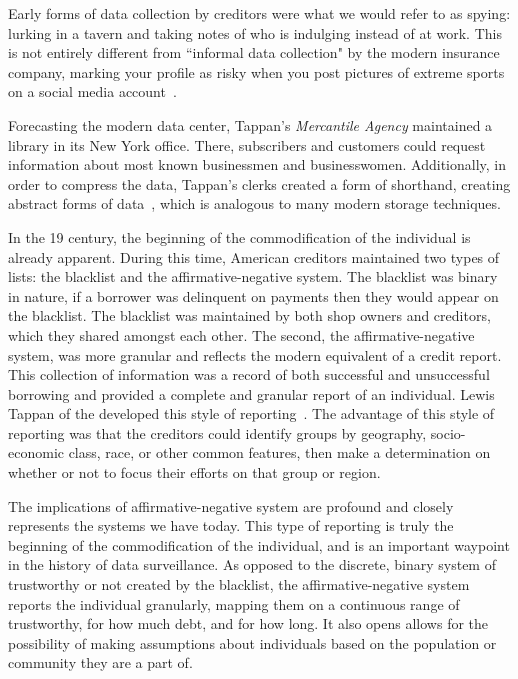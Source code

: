 Early forms of data collection by creditors were what we would refer to as
spying: lurking in a tavern and taking notes of who is indulging instead of at
work. This is not entirely different from ``informal data collection" by the
modern insurance company, marking your profile as risky when you post pictures
of extreme sports on a social media account~\cite{naic2012}.

Forecasting the modern data center, Tappan's \textit{Mercantile Agency}
maintained a library in its New York office. There, subscribers and customers
could request information about most known businessmen and businesswomen.
Additionally, in order to compress the data, Tappan's clerks created a form of
shorthand, creating abstract forms of data~\cite{lauer2017creditworthy}, which
is analogous to many modern storage techniques.


In the 19 century, the beginning of the commodification of the
individual is already apparent. During this time, American creditors
maintained two types of lists: the blacklist and the affirmative-negative
system. The blacklist was binary in nature, if a borrower was delinquent on
payments then they would appear on the blacklist. The blacklist was maintained
by both shop owners and creditors, which they shared amongst each other. The
second, the affirmative-negative system, was more granular and reflects the modern
equivalent of a credit report. This collection of information was a record of
both successful and unsuccessful borrowing and provided a complete and granular
report of an individual. Lewis Tappan of the \mca developed this style of
reporting~\cite{lauer2017creditworthy}. The advantage of this style of reporting was that the creditors
could identify groups by geography, socio-economic class, race, or other common
features, then make a determination on whether or not to focus their efforts on
that group or region.

The implications of affirmative-negative system are profound and closely
represents the systems we have today. This type of reporting is truly the
beginning of the commodification of the individual, and is an important
waypoint in the history of data surveillance. As opposed to the discrete,
binary system of trustworthy or not created by the blacklist, the
affirmative-negative system reports the individual granularly, mapping them on
a continuous range of trustworthy, for how much debt, and for how long. It also
opens allows for the possibility of making assumptions about individuals based
on the population or community they are a part of.

